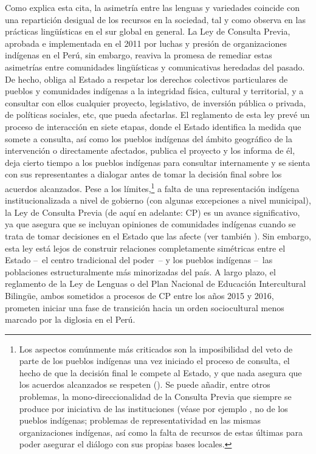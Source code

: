 \documentclass[output=paper]{../langscibook}
\begin{document}
Como explica esta cita, la asimetría entre las lenguas y variedades coincide con una repartición desigual de los recursos en la sociedad, tal y como observa \citet{Léglise2017} en las prácticas lingüísticas en el sur global en general. La Ley de Consulta Previa, aprobada e implementada en el 2011 por luchas y presión de organizaciones indígenas en el Perú, sin embargo, reaviva la promesa de remediar estas asimetrías entre comunidades lingüísticas y comunicativas heredadas del pasado. De hecho, obliga al Estado a respetar los derechos colectivos particulares de pueblos y comunidades indígenas a la integridad física, cultural y territorial, y a consultar con ellos cualquier proyecto, legislativo, de inversión pública o privada, de políticas sociales, etc, que pueda afectarlas. El reglamento de esta ley prevé un proceso de interacción en siete etapas, donde el Estado identifica la medida que somete a consulta, así como los pueblos indígenas del ámbito geográfico de la intervención o directamente afectados, publica el proyecto y los informa de él, deja cierto tiempo a los pueblos indígenas para consultar internamente y se sienta con sus representantes a dialogar antes de tomar la decisión final sobre los acuerdos alcanzados. Pese a los límites,\footnote{Los aspectos comúnmente más criticados son la imposibilidad del veto de parte de los pueblos indígenas una vez iniciado el proceso de consulta, el hecho de que la decisión final le compete al Estado, y que nada asegura que los acuerdos alcanzados se respeten (\citealt{VegaAuqui2016}). Se puede añadir, entre otros problemas, la mono-direccionalidad de la Consulta Previa que siempre se produce por iniciativa de las instituciones (véase por ejemplo \citealt{Mick2016}, no de los pueblos indígenas; problemas de representatividad en las mismas organizaciones indígenas, así como la falta de recursos de estas últimas para poder asegurar el diálogo con sus propias bases locales.} a falta de una representación indígena institucionalizada a nivel de gobierno (con algunas excepciones a nivel municipal), la Ley de Consulta Previa (de aquí en adelante: CP) es un avance significativo, ya que asegura que se incluyan opiniones de comunidades indígenas cuando se trata de tomar decisiones en el Estado que las afecte (ver también \citealt{Vargas2016}). Sin embargo, esta ley está lejos de construir relaciones completamente simétricas entre el Estado -- el centro tradicional del poder -- y los pueblos indígenas – las poblaciones estructuralmente más minorizadas del país. A largo plazo, el reglamento de la Ley de Lenguas o del Plan Nacional de Educación Intercultural Bilingüe, ambos sometidos a procesos de CP entre los años 2015 y 2016, prometen iniciar una fase de transición hacia un orden sociocultural menos marcado por la diglosia en el Perú.
\end{document}
